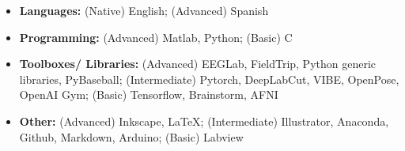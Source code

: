 \begin{adjustwidth}{-.75em}{0pt}
    \begin{itemize}
    \item[] \textbf{Languages:} (Native) English; (Advanced) Spanish\\
    \item[] \textbf{Programming: }(Advanced) Matlab, Python; (Basic) C
    \item[] \textbf{Toolboxes/ Libraries:} (Advanced) EEGLab, FieldTrip, Python generic 
    libraries, PyBaseball; (Intermediate) Pytorch, DeepLabCut, VIBE, OpenPose, OpenAI Gym; (Basic) Tensorflow, Brainstorm, AFNI
    \item[] \textbf{Other:} (Advanced) Inkscape, LaTeX; (Intermediate) Illustrator, Anaconda, Github, Markdown, Arduino; (Basic) Labview
    \end{itemize}
\end{adjustwidth}
